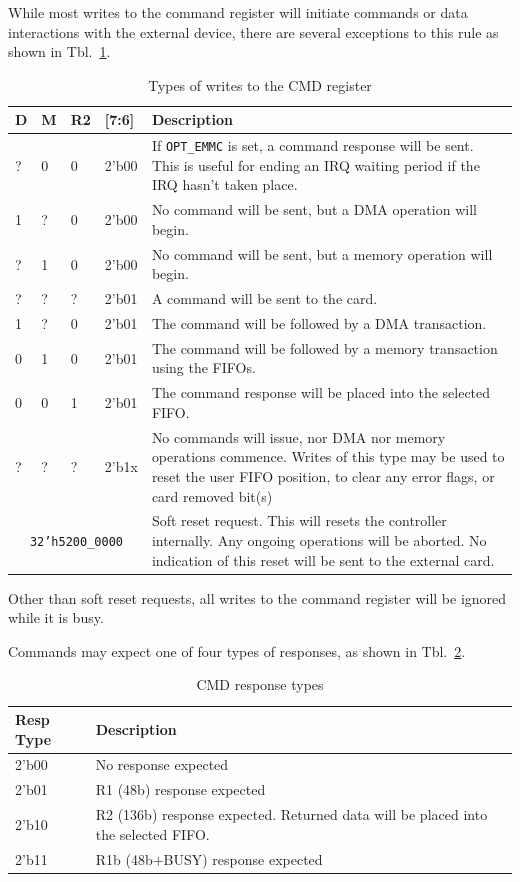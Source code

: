 \documentclass{gqtekspec}
\begin{document}
While most writes to the command register will initiate commands or data
interactions with the external device, there are several exceptions to this
rule as shown in Tbl.~\ref{tbl:CMD-BITS}.
\begin{table}\begin{center}
\begin{tabular}{|p{0.36in}|p{0.36in}|p{0.36in}|p{0.36in}|p{4.0in}|}\hline
	\rowcolor[gray]{0.85} D & M & R2 & [7:6] & Description\\\hline\hline
? & 0 & 0 & 2'b00 & If {\tt OPT\_EMMC} is set, a command response will be
	sent.  This is useful for ending an IRQ waiting period if the IRQ
	hasn't taken place. \\
1 & ? & 0 & 2'b00 & No command will be sent, but a DMA operation will
	begin. \\
? & 1 & 0 & 2'b00 & No command will be sent, but a memory operation will
	begin. \\
? & ? & ? & 2'b01 & A command will be sent to the card. \\
1 & ? & 0 & 2'b01 & The command will be followed by a DMA transaction. \\
0 & 1 & 0 & 2'b01 & The command will be followed by a memory transaction
	using the FIFOs. \\
0 & 0 & 1 & 2'b01 & The command response will be placed into the selected
	FIFO. \\
? & ? & ? & 2'b1x & No commands will issue, nor DMA nor memory operations
	commence.  Writes of this type may be used to reset the user FIFO
	position, to clear any error flags, or card removed bit(s)\\\cline{1-4}
\multicolumn{4}{|c|}{{\tt 32'h5200\_0000}} & Soft reset request.  This will
	resets the controller internally.  Any ongoing operations will be
	aborted.  No indication of this reset will be sent to the external
	card.  \\\hline
\end{tabular}
\caption{Types of writes to the CMD register}\label{tbl:CMD-BITS}
\end{center}\end{table}
Other than soft reset requests, all writes to the command register will be
ignored while it is busy.

Commands may expect one of four types of responses, as shown in
Tbl.~\ref{tbl:CMD-TYPE}.
\begin{table}\begin{center}
\begin{tabular}{|p{1.2in}|p{4.0in}|}\hline
	\rowcolor[gray]{0.85} Resp Type & Description\\\hline\hline
2'b00 & No response expected \\
2'b01 & R1 (48b) response expected\\
2'b10 & R2 (136b) response expected.  Returned data will be placed into
	the selected FIFO.\\
2'b11 & R1b (48b+BUSY) response expected
	\\\hline
\end{tabular}
\caption{CMD response types}\label{tbl:CMD-TYPE}
\end{center}\end{table}
\end{document}
